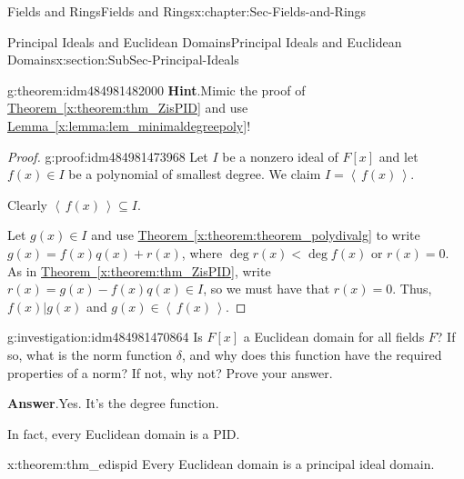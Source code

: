 \documentclass[oneside,10pt,]{book}
\newcommand{\blocktitlefont}{\relax}
\newcommand{\xreffont}{\relax}
\numberwithin{equation}{section}
\newcommand{\ideal}[1]{\left\langle\, #1 \,\right\rangle}
\newcommand{\lt}{<}
\begin{document}
\begin{chapterptx}{Fields and Rings}{}{Fields and Rings}{}{}{x:chapter:Sec-Fields-and-Rings}
\begin{sectionptx}{Principal Ideals and Euclidean Domains}{}{Principal Ideals and Euclidean Domains}{}{}{x:section:SubSec-Principal-Ideals}
\begin{theorem}{}{}{g:theorem:idm484981482000}
\textbf{\blocktitlefont Hint}.\quad{}Mimic the proof of \hyperref[x:theorem:thm_ZisPID]{Theorem~{\xreffont\ref{x:theorem:thm_ZisPID}}} and use \hyperref[x:lemma:lem_minimaldegreepoly]{Lemma~{\xreffont\ref{x:lemma:lem_minimaldegreepoly}}}!%
\end{theorem}
\begin{proof}{}{g:proof:idm484981473968}
Let \(I\) be a nonzero ideal of \(F[x]\) and let \(f(x)\in I\) be a polynomial of smallest degree. We claim \(I = \ideal{f(x)}\).%
\par
Clearly \(\ideal{f(x)}\subseteq I\).%
\par
Let \(g(x)\in I\) and use \hyperref[x:theorem:theorem_polydivalg]{Theorem~{\xreffont\ref{x:theorem:theorem_polydivalg}}} to write \(g(x) = f(x) q(x) + r(x)\), where \(\deg r(x) \lt \deg f(x)\) or \(r(x) = 0\). As in \hyperref[x:theorem:thm_ZisPID]{Theorem~{\xreffont\ref{x:theorem:thm_ZisPID}}}, write \(r(x) = g(x) - f(x) q(x) \in I\), so we must have that \(r(x) = 0\). Thus, \(f(x) | g(x)\) and \(g(x)\in \ideal{f(x)}\).%
\end{proof}
\begin{investigation}{}{g:investigation:idm484981470864}%
Is \(F[x]\) a Euclidean domain for all fields \(F\)? If so, what is the norm function \(\delta\), and why does this function have the required properties of a norm? If not, why not? Prove your answer.%
\par\smallskip%
\noindent\textbf{\blocktitlefont Answer}.\hypertarget{g:answer:idm484981463808}{}\quad{}Yes. It's the degree function.%
\end{investigation}
In fact, every Euclidean domain is a PID.%
\begin{theorem}{}{}{x:theorem:thm_edispid}%
Every Euclidean domain is a principal ideal domain.%


\end{theorem}
\end{sectionptx}
\end{chapterptx}
\end{document}
